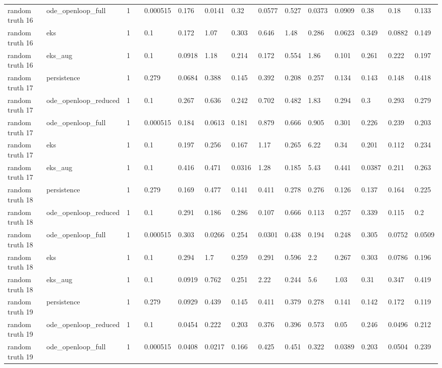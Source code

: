 \begin{table}[t]
\begin{tabular}{lllllllllllllll}
random truth 16 & ode\_openloop\_full & 1 &  & 0.000515 & 0.176 & 0.0141 & 0.32 & 0.0577 & 0.527 & 0.0373 & 0.0909 & 0.38 & 0.18 & 0.133 \\
random truth 16 & eks & 1 &  & 0.1 & 0.172 & 1.07 & 0.303 & 0.646 & 1.48 & 0.286 & 0.0623 & 0.349 & 0.0882 & 0.149 \\
random truth 16 & eks\_aug & 1 &  & 0.1 & 0.0918 & 1.18 & 0.214 & 0.172 & 0.554 & 1.86 & 0.101 & 0.261 & 0.222 & 0.197 \\
random truth 17 & persistence & 1 &  & 0.279 & 0.0684 & 0.388 & 0.145 & 0.392 & 0.208 & 0.257 & 0.134 & 0.143 & 0.148 & 0.418 \\
random truth 17 & ode\_openloop\_reduced & 1 &  & 0.1 & 0.267 & 0.636 & 0.242 & 0.702 & 0.482 & 1.83 & 0.294 & 0.3 & 0.293 & 0.279 \\
random truth 17 & ode\_openloop\_full & 1 &  & 0.000515 & 0.184 & 0.0613 & 0.181 & 0.879 & 0.666 & 0.905 & 0.301 & 0.226 & 0.239 & 0.203 \\
random truth 17 & eks & 1 &  & 0.1 & 0.197 & 0.256 & 0.167 & 1.17 & 0.265 & 6.22 & 0.34 & 0.201 & 0.112 & 0.234 \\
random truth 17 & eks\_aug & 1 &  & 0.1 & 0.416 & 0.471 & 0.0316 & 1.28 & 0.185 & 5.43 & 0.441 & 0.0387 & 0.211 & 0.263 \\
random truth 18 & persistence & 1 &  & 0.279 & 0.169 & 0.477 & 0.141 & 0.411 & 0.278 & 0.276 & 0.126 & 0.137 & 0.164 & 0.225 \\
random truth 18 & ode\_openloop\_reduced & 1 &  & 0.1 & 0.291 & 0.186 & 0.286 & 0.107 & 0.666 & 0.113 & 0.257 & 0.339 & 0.115 & 0.2 \\
random truth 18 & ode\_openloop\_full & 1 &  & 0.000515 & 0.303 & 0.0266 & 0.254 & 0.0301 & 0.438 & 0.194 & 0.248 & 0.305 & 0.0752 & 0.0509 \\
random truth 18 & eks & 1 &  & 0.1 & 0.294 & 1.7 & 0.259 & 0.291 & 0.596 & 2.2 & 0.267 & 0.303 & 0.0786 & 0.196 \\
random truth 18 & eks\_aug & 1 &  & 0.1 & 0.0919 & 0.762 & 0.251 & 2.22 & 0.244 & 5.6 & 1.03 & 0.31 & 0.347 & 0.419 \\
random truth 19 & persistence & 1 &  & 0.279 & 0.0929 & 0.439 & 0.145 & 0.411 & 0.379 & 0.278 & 0.141 & 0.142 & 0.172 & 0.119 \\
random truth 19 & ode\_openloop\_reduced & 1 &  & 0.1 & 0.0454 & 0.222 & 0.203 & 0.376 & 0.396 & 0.573 & 0.05 & 0.246 & 0.0496 & 0.212 \\
random truth 19 & ode\_openloop\_full & 1 &  & 0.000515 & 0.0408 & 0.0217 & 0.166 & 0.425 & 0.451 & 0.322 & 0.0389 & 0.203 & 0.0504 & 0.239 \\

\end{tabular}
\end{table}
